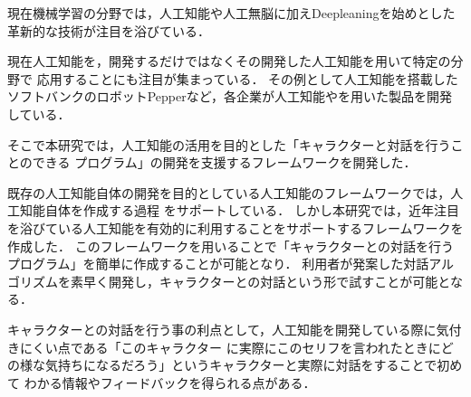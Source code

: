 %
現在機械学習の分野では，人工知能や人工無脳に加えDeepleaningを始めとした
革新的な技術が注目を浴びている．

現在人工知能を，開発するだけではなくその開発した人工知能を用いて特定の分野で
応用することにも注目が集まっている．
その例として人工知能を搭載したソフトバンクのロボットPepperなど，各企業が人工知能やを用いた製品を開発している．

そこで本研究では，人工知能の活用を目的とした「キャラクターと対話を行うことのできる
プログラム」の開発を支援するフレームワークを開発した．

既存の人工知能自体の開発を目的としている人工知能のフレームワークでは，人工知能自体を作成する過程
をサポートしている．
しかし本研究では，近年注目を浴びている人工知能を有効的に利用することをサポートするフレームワークを作成した．
このフレームワークを用いることで「キャラクターとの対話を行うプログラム」を簡単に作成することが可能となり．
利用者が発案した対話アルゴリズムを素早く開発し，キャラクターとの対話という形で試すことが可能となる．

キャラクターとの対話を行う事の利点として，人工知能を開発している際に気付きにくい点である「このキャラクター
に実際にこのセリフを言われたときにどの様な気持ちになるだろう」というキャラクターと実際に対話をすることで初めて
わかる情報やフィードバックを得られる点がある．
